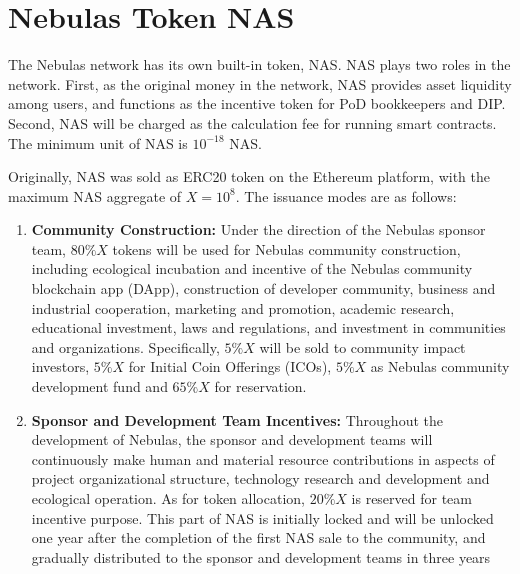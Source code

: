 \section{Nebulas Token NAS}
\label{sec:nascoin}

The Nebulas network has its own built-in token, NAS. NAS plays two roles in the network. First, as the original money in the network, NAS provides asset liquidity among users, and functions as the incentive token for PoD bookkeepers and DIP. Second, NAS will be charged as the calculation fee for running smart contracts. The minimum unit of NAS is $10^{-18}$ NAS.


Originally, NAS was sold as ERC20 token on the Ethereum platform, with the maximum NAS aggregate of $X = 10^8.$ The issuance modes are as follows:

\begin{enumerate}
	\item \textbf{Community Construction:}
	Under the direction of the Nebulas sponsor team, $80\%X$ tokens will be used for Nebulas community construction, including ecological incubation and incentive of the Nebulas community blockchain app (DApp), construction of developer community, business and industrial cooperation, marketing and promotion, academic research, educational investment, laws and regulations, and investment in communities and organizations. Specifically, $5\%X$ will be sold to community impact investors, $5\%X$ for Initial Coin Offerings (ICOs), $5\%X$ as Nebulas community development fund and $65\%X$ for reservation.
	

	\item \textbf{Sponsor and Development Team Incentives:}
	Throughout the development of Nebulas, the sponsor and development teams will continuously make human and material resource contributions in aspects of project organizational structure, technology research and development and ecological operation. As for token allocation, $20\%X$ is reserved for team incentive purpose. This part of NAS is initially locked and will be unlocked one year after the completion of the first NAS sale to the community, and gradually distributed to the sponsor and development teams in three years
	
\end{enumerate}

